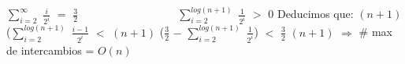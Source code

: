 \documentclass[10pt,a4paper]{article}
\begin{document}
\newline
$\displaystyle \sum_{i=2}^{\infty}$ $\displaystyle \frac{i}{2^{i}}$ $=$ $\displaystyle \frac{3}{2}$~~~~~~~~~~~~~~~~~~$\displaystyle \sum_{i=2}^{log(n+1)}$ $\displaystyle \frac{1}{2^{i}}$ $>$ $0$
\newline
\newline
\newline
Deducimos que:
\newline
\newline
$(n+1)$ ($\displaystyle \sum_{i=2}^{log(n+1)}$ $\displaystyle \frac{i-1}{2^{i}}$ $<$ $(n+1)$ ($\displaystyle \frac{3}{2}$ $-$ $\displaystyle \sum_{i=2}^{log(n+1)}$ $\displaystyle \frac{1}{2^{i}}$) $<$ $\displaystyle \frac{3}{2}$ $(n+1)$ $\Rightarrow$ \# max de intercambios = $O(n)$
 
\end{document}
